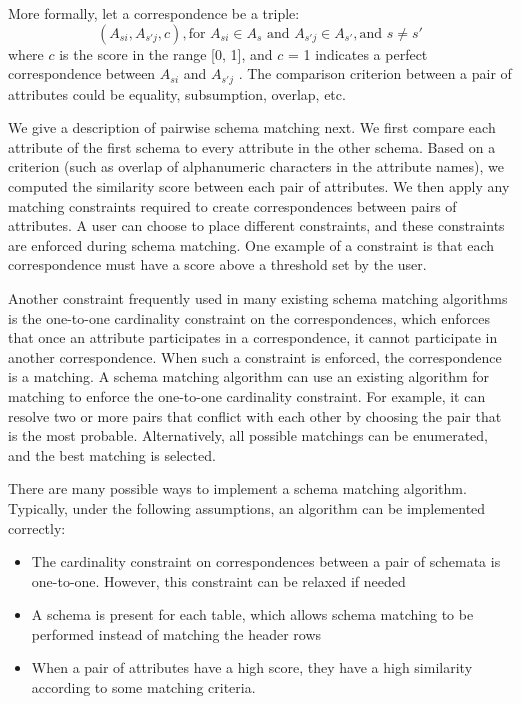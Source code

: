 More formally, let a correspondence be a triple:
\[
(A_{si},A_{s'j},c),\text{for }A_{si}\in A_{s}\text{ and }A_{s'j}\in A_{s'},\text{and }s\neq s'
\]
where $c$ is the score in the range {[}0, 1{]}, and $c$ = 1 indicates a perfect correspondence between $A_{si}$ and $A_{s'j}$ . The comparison criterion between a pair of attributes could be equality, subsumption, overlap, etc.

We give a description of pairwise schema matching next. We first compare each attribute of the first schema to every attribute in the other schema. Based on a criterion (such as overlap of alphanumeric characters in the attribute names), we computed the similarity score between each pair of attributes. We then apply any matching constraints required to create correspondences between pairs of attributes. A user can choose to place different constraints, and these constraints are enforced during schema matching. One example of a constraint is that each correspondence must have a score above a threshold set by the user.

Another constraint frequently used in many existing schema matching algorithms is the one-to-one cardinality constraint on the correspondences, which enforces that once an attribute participates in a correspondence, it cannot participate in another correspondence. When such a constraint is enforced, the correspondence is a matching. A schema matching algorithm can use an existing algorithm for matching to enforce the one-to-one cardinality constraint. For example, it can resolve two or more pairs that conflict with each other by choosing the pair that is the most probable. Alternatively, all possible matchings can be enumerated, and the best matching is selected.

There are many possible ways to implement a schema matching algorithm. Typically, under the following assumptions, an algorithm can be implemented correctly:

\begin{itemize}
\item The cardinality constraint on correspondences between a pair of schemata is one-to-one. However, this constraint can be relaxed if needed
\item A schema is present for each table, which allows schema matching to be performed instead of matching the header rows
\item When a pair of attributes have a high score, they have a high similarity according to some matching criteria.	
\end{itemize}

